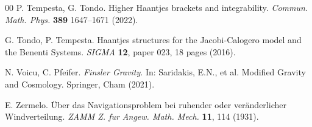 \documentclass[10pt]{amsart}
\numberwithin{equation}{section}
\newcommand{\tbf}{\textbf}
\theoremstyle{definition}
\begin{document}
\begin{thebibliography}{00}
		 P. Tempesta, G. Tondo. Higher Haantjes brackets and integrability. \textit{Commun. Math. Phys.} \tbf{389} 1647–1671 (2022).
		
		 G. Tondo, P. Tempesta. Haantjes structures for the Jacobi-Calogero model and the Benenti Systems. \textit{SIGMA} \textbf{12}, paper 023, 18 pages (2016).
		
		 N. Voicu, C. Pfeifer. \textit{Finsler Gravity}. In: Saridakis, E.N., et al. Modified Gravity and Cosmology. Springer, Cham (2021).
		
		E. Zermelo. {\"U}ber das Navigationsproblem bei ruhender oder veränderlicher Windverteilung. \textit{ZAMM Z. fur Angew. Math. Mech.}
		\textbf{11}, 114 (1931).
	\end{thebibliography}
	
	
\end{document}
